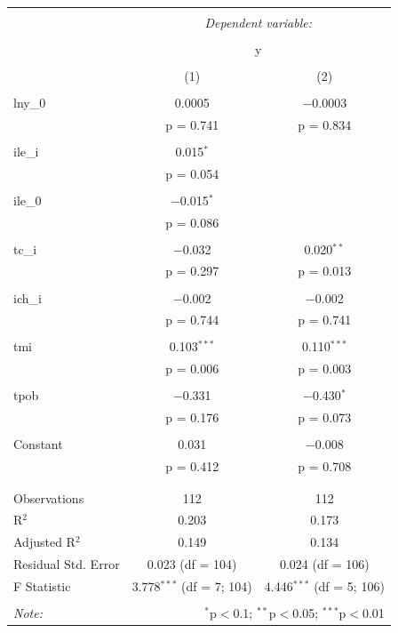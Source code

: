 \begin{table}[!htbp] \centering 
    \tiny
  \caption{} 
  \label{} 
\begin{tabular}{@{\extracolsep{5pt}}lcc} 
\\[-1.8ex]\hline 
\hline \\[-1.8ex] 
 & \multicolumn{2}{c}{\textit{Dependent variable:}} \\ 
\cline{2-3} 
\\[-1.8ex] & \multicolumn{2}{c}{y} \\ 
\\[-1.8ex] & (1) & (2)\\ 
\hline \\[-1.8ex] 
 lny\_0 & 0.0005 & $-$0.0003 \\ 
  & p = 0.741 & p = 0.834 \\ 
  & & \\ 
 ile\_i & 0.015$^{*}$ &  \\ 
  & p = 0.054 &  \\ 
  & & \\ 
 ile\_0 & $-$0.015$^{*}$ &  \\ 
  & p = 0.086 &  \\ 
  & & \\ 
 tc\_i & $-$0.032 & 0.020$^{**}$ \\ 
  & p = 0.297 & p = 0.013 \\ 
  & & \\ 
 ich\_i & $-$0.002 & $-$0.002 \\ 
  & p = 0.744 & p = 0.741 \\ 
  & & \\ 
 tmi & 0.103$^{***}$ & 0.110$^{***}$ \\ 
  & p = 0.006 & p = 0.003 \\ 
  & & \\ 
 tpob & $-$0.331 & $-$0.430$^{*}$ \\ 
  & p = 0.176 & p = 0.073 \\ 
  & & \\ 
 Constant & 0.031 & $-$0.008 \\ 
  & p = 0.412 & p = 0.708 \\ 
  & & \\ 
\hline \\[-1.8ex] 
Observations & 112 & 112 \\ 
R$^{2}$ & 0.203 & 0.173 \\ 
Adjusted R$^{2}$ & 0.149 & 0.134 \\ 
Residual Std. Error & 0.023 (df = 104) & 0.024 (df = 106) \\ 
F Statistic & 3.778$^{***}$ (df = 7; 104) & 4.446$^{***}$ (df = 5; 106) \\ 
\hline 
\hline \\[-1.8ex] 
\textit{Note:}  & \multicolumn{2}{r}{$^{*}$p$<$0.1; $^{**}$p$<$0.05; $^{***}$p$<$0.01} \\ 
\end{tabular} 
\end{table}



